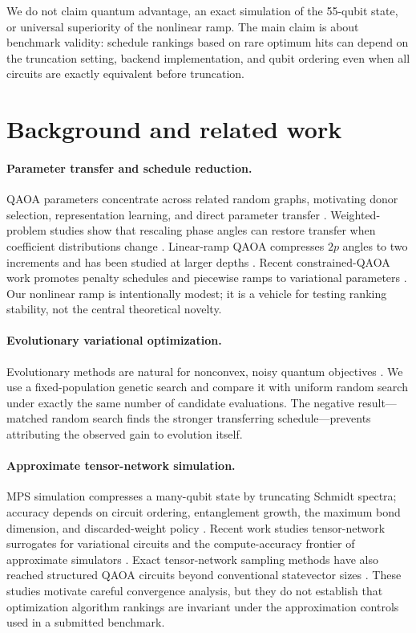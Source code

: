 \documentclass[10pt,twocolumn]{article}
\begin{document}
We do not claim quantum advantage, an exact simulation of the 55-qubit state,
or universal superiority of the nonlinear ramp. The main claim is about
benchmark validity: schedule rankings based on rare optimum hits can depend on
the truncation setting, backend implementation, and qubit ordering even when
all circuits are exactly equivalent before truncation.

\section{Background and related work}

\paragraph{Parameter transfer and schedule reduction.}
QAOA parameters concentrate across related random graphs, motivating donor
selection, representation learning, and direct parameter transfer
\cite{galda,montanez}. Weighted-problem studies show that rescaling phase
angles can restore transfer when coefficient distributions change
\cite{sureshbabu}. Linear-ramp QAOA compresses $2p$ angles to two increments
and has been studied at larger depths \cite{lrqaoa}. Recent constrained-QAOA
work promotes penalty schedules and piecewise ramps to variational parameters
\cite{penaltyschedule}. Our nonlinear ramp is intentionally modest; it is a
vehicle for testing ranking stability, not the central theoretical novelty.

\paragraph{Evolutionary variational optimization.}
Evolutionary methods are natural for nonconvex, noisy quantum objectives
\cite{de}. We use a fixed-population genetic search and compare it with uniform
random search under exactly the same number of candidate evaluations. The
negative result---matched random search finds the stronger transferring
schedule---prevents attributing the observed gain to evolution itself.

\paragraph{Approximate tensor-network simulation.}
MPS simulation compresses a many-qubit state by truncating Schmidt spectra;
accuracy depends on circuit ordering, entanglement growth, the maximum bond
dimension, and discarded-weight policy \cite{mpsreview}. Recent work studies
tensor-network surrogates for variational circuits and the compute-accuracy
frontier of approximate simulators \cite{tnsurrogate,zerosetup}. Exact
tensor-network sampling methods have also reached structured QAOA circuits
beyond conventional statevector sizes \cite{pilotwave}. These studies motivate
careful convergence analysis, but they do not establish that optimization
algorithm rankings are invariant under the approximation controls used in a
submitted benchmark.
\end{document}
